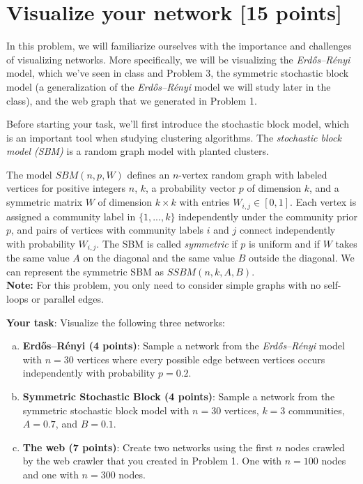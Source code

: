\documentclass[11pt]{article}
\begin{document}
\section{Visualize your network [15 points]}

In this problem, we will familiarize ourselves with the importance and challenges of visualizing networks. More specifically, we will be visualizing the {\em Erd\H{o}s--R\'{e}nyi} model, which we've seen in class and Problem 3, the symmetric stochastic block model (a generalization of the {\em Erd\H{o}s--R\'{e}nyi} model we will study later in the class), and the web graph that we generated in Problem 1. 

Before starting your task, we'll first introduce the stochastic block model, which is an important tool when studying clustering algorithms.  The \textit{stochastic block model (SBM)} is a random graph model with planted clusters.

The model $SBM(n, p, W)$ defines an $n$-vertex random graph with labeled vertices for positive integers $n$, $k$, a probability vector $p$ of dimension $k$, and a symmetric matrix $W$ of dimension $k \times k$ with entries $W_{i,j} \in [0, 1]$. Each vertex is assigned a community label in $\{1,..., k\}$ independently under the community prior $p$, and pairs of vertices with community labels $i$ and $j$ connect independently with probability $W_{i,j}$. The SBM is called \emph{symmetric} if $p$ is uniform and if $W$ takes the same value $A$ on the diagonal and the same value $B$ outside the diagonal. We can represent the symmetric SBM as $SSBM(n, k, A, B)$. \\
\textbf{Note:} For this problem, you only need to consider simple graphs with no self-loops or parallel edges.
\vspace{.1in}
 
\noindent\textbf{Your task}: Visualize the following three networks:

\begin{enumerate}[(a)]
    \item \textbf{Erd\H{o}s--R\'{e}nyi (4 points)}: Sample a network from the {\em Erd\H{o}s--R\'{e}nyi} model with $n = 30$ vertices where every possible edge between vertices occurs independently with probability $p = 0.2$. 
    
    \item \textbf{Symmetric Stochastic Block (4 points)}: Sample a network from the symmetric stochastic block model with $n = 30$ vertices, $k = 3$ communities, $A = 0.7$, and $B = 0.1$.
    
    \item \textbf{The web (7 points)}: Create two networks using the first $n$ nodes crawled by the web crawler that you created in Problem 1. One with $n = 100$ nodes and one with $n = 300$ nodes. 
\end{enumerate}
\end{document}
